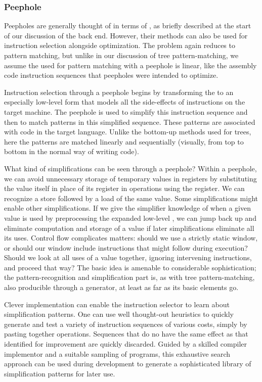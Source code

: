 \subsubsection{Peephole}
Peepholes are generally thought of in terms of , as briefly described at the start of our discussion of the back end. However, their methods can also be used for instruction selection alongside optimization. The problem again reduces to pattern matching, but unlike in our discussion of tree pattern-matching, we assume the \IR used for pattern matching with a peephole is linear, like the assembly code instruction sequences that peepholes were intended to optimize.

Instruction selection through a peephole begins by transforming the \IR to an especially low-level form that models all the side-effects of instructions on the target machine. The peephole is used to simplify this instruction sequence and then to match patterns in this simplified sequence. These patterns are associated with code in the target language. Unlike the bottom-up methods used for trees, here the patterns are matched linearly and sequentially (visually, from top to bottom in the normal way of writing code).

What kind of simplifications can be seen through a peephole? Within a peephole, we can avoid unnecessary storage of temporary values in registers by substituting the value itself in place of its register in operations using the register. We can recognize a store followed by a load of the same value. Some simplifications might enable other simplifications. If we give the simplifier knowledge of when a given value is used by preprocessing the expanded low-level , we can jump back up and eliminate computation and storage of a value if later simplifications eliminate all its uses. Control flow complicates matters: should we use a strictly static window, or should our window include instructions that might follow during execution? Should we look at all uses of a value together, ignoring intervening instructions, and proceed that way? The basic idea is amenable to considerable sophistication; the pattern-recognition and simplification part is, as with tree pattern-matching, also producible through a generator, at least as far as its basic elements go.

Clever implementation can enable the instruction selector to learn about simplification patterns. One can use well thought-out heuristics to quickly generate and test a variety of instruction sequences of various costs, simply by pasting together operations. Sequences that do no have the same effect as that identified for improvement are quickly discarded. Guided by a skilled compiler implementor and a suitable sampling of programs, this exhaustive search approach can be used during development to generate a sophisticated library of simplification patterns for later use.


